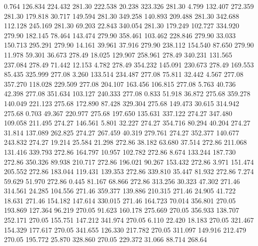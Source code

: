    0.764  126.834  224.432       281.30
 222.538   20.238  323.326       281.30
   4.799  132.407  272.359       281.30
 179.818   30.717  149.594       281.30
 349.258  140.893  209.488       281.30
 342.688  112.128  245.169       281.30
  69.203   22.843  340.054       281.30
 179.249  102.727  334.920       279.90
 182.145   78.464  143.474       279.90
 358.461  103.462  228.846       279.90
  33.033  150.713  295.291       279.90
  14.161   39.961   37.916       279.90
 238.112  154.540   87.650       279.90
  11.978   59.301   36.673       278.49
  18.025  129.907  258.961       278.49
 340.231  131.565  237.084       278.49
  71.442   12.153    4.782       278.49
 354.232  145.091  230.673       278.49
 169.553   85.435  325.999       277.08
   3.260  133.514  234.487       277.08
  75.811   32.442    4.567       277.08
 357.270  118.028  229.509       277.08
 204.107  163.456  106.815       277.08
   5.763   40.736   42.398       277.08
 351.634  103.127  240.333       277.08
   0.833   51.918   36.872       275.68
 359.278  140.049  221.123       275.68
 172.890   87.428  329.304       275.68
 149.473   30.615  314.942       275.68
   0.703   49.367  220.977       275.68
 197.650  135.631  337.122       274.27
 347.480  109.058  211.495       274.27
 146.561    5.801   32.227       274.27
 354.716   80.294   40.204       274.27
  31.814  137.089  262.825       274.27
 267.459   40.319  279.761       274.27
 352.377  140.677  243.832       274.27
  19.214   25.584   21.298       272.86
  38.182   63.680   37.514       272.86
 211.068  131.416  339.793       272.86
 164.797   10.957  102.782       272.86
   8.674  133.244  187.730       272.86
 350.326   89.938  210.717       272.86
 196.021   90.267  153.432       272.86
   3.971  151.474  205.552       272.86
 183.044  119.431  139.353       272.86
 339.810   35.447   81.932       272.86
   7.274   59.629   51.970       272.86
   0.445   81.167   68.866       272.86
 313.256   30.323   47.302       271.46
 314.561   24.285  104.556       271.46
 359.377  139.886  210.315       271.46
  24.905   41.722   18.631       271.46
 154.182  147.614  330.015       271.46
 164.723   70.014  356.801       270.05
 193.869  127.364   96.219       270.05
  91.623  160.178  275.669       270.05
 356.933  138.707  252.171       270.05
 155.751  147.212  341.974       270.05
   6.110   22.420   18.183       270.05
 321.467  154.329  177.617       270.05
 341.655  126.330  217.782       270.05
 311.097  149.916  212.479       270.05
 195.772   25.870  328.860       270.05
 229.372   31.066   88.714       268.64
